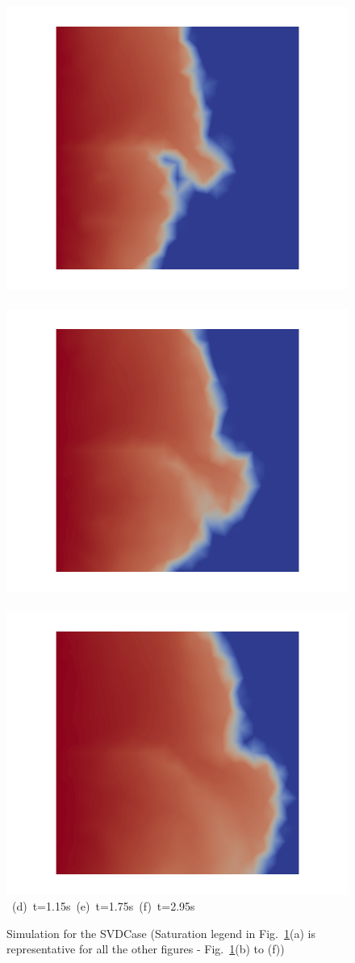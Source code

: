 \begin{landscape}
\begin{figure}[ht]
{\vspace{0.5cm}
\hbox{
      \includegraphics[width=.56\textwidth]{./Pics/SVDCase/SVDCase_Saturation_t_1dot15.png}
      \includegraphics[width=.56\textwidth]{./Pics/SVDCase/SVDCase_Saturation_t_1dot75.png} 
      \includegraphics[width=.56\textwidth]{./Pics/SVDCase/SVDCase_Saturation_t_2dot95.png}}
\vspace{0.cm}
\hbox{ \hspace{2.5cm} (d) t=1.15s \hspace{5.5cm} (e) t=1.75s   \hspace{5.5cm} (f) t=2.95s}
\vspace{0.cm}
}   
\caption{Simulation for the SVDCase (Saturation legend in Fig.~\ref{fig:SVDCase_Saturation}(a) is representative for all the other figures - \ie Fig.~\ref{fig:SVDCase_Saturation}(b) to (f))}
\label{fig:SVDCase_Saturation}
\end{figure}
\end{landscape}
\clearpage



